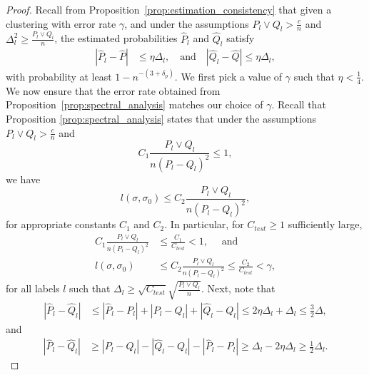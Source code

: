 \documentclass{article}
\begin{document}
\begin{proof}
Recall from Proposition~\ref{prop:estimation_consistency} that given a clustering with error rate $\gamma$, and under the assumptions  $P_l \vee Q_l > \frac{c}{n}$ and $\Delta_l^2 \geq \frac{P_l \vee Q_l}{n}$, the estimated probabilities $\hat P_l$ and $\hat Q_l$ satisfy 
\begin{align*}
|\hat P_l - \hat P| &\leq \eta \Delta_l, \quad \text{and} \quad |\hat Q_l - \hat Q| \leq \eta \Delta_l,
\end{align*}
with probability at least $1-n^{-(3+\delta_p)}$. We first pick a value of $\gamma$ such that $\eta < \frac{1}{4}$. We now ensure that the error rate obtained from Proposition~\ref{prop:spectral_analysis} matches our choice of $\gamma$. Recall that Proposition \ref{prop:spectral_analysis} states that under the assumptions $P_l \vee Q_l > \frac{c}{n}$ and 
$$ C_1 \frac{P_l \vee Q_l}{n(P_l - Q_l)^2} \leq 1,$$
we have
$$l(\sigma, \sigma_0) \leq C_2 \frac{P_l \vee Q_l}{n(P_l - Q_l)^2},$$
for appropriate constants $C_1$ and $C_2$. In particular, for $C_{test} \ge 1$ sufficiently large,
\begin{align*}
C_1 \frac{P_l \vee Q_l}{n(P_l - Q_l)^2} & \leq \frac{C_1}{C_{test}} < 1, \quad \text{ and}\\
l(\sigma, \sigma_0) & \leq C_2 \frac{P_l \vee Q_l}{n(P_l - Q_l)^2} \leq \frac{C_2}{C_{test}} < \gamma,
\end{align*}
for all labels $l$ such that $\Delta_l \geq \sqrt{C_{test}} \sqrt{\frac{P_l \vee Q_l}{n}}$.
Next, note that
\begin{align*}
| \hat{P}_l - \hat{Q}_l | &\leq |\hat{P}_l - P_l| + |P_l - Q_l| + |\hat{Q}_l - Q_l| \leq 2 \eta \Delta_l + \Delta_l \leq \frac{3}{2} \Delta,
\end{align*}
and
\begin{align*}
| \hat{P}_l - \hat{Q}_l | &\geq  |P_l - Q_l| - |\hat{Q}_l - Q_l| - |\hat{P}_l - P_l| \geq  \Delta_l - 2\eta \Delta_l \geq \frac{1}{2} \Delta_l.
\end{align*}

\end{proof}
\end{document}

